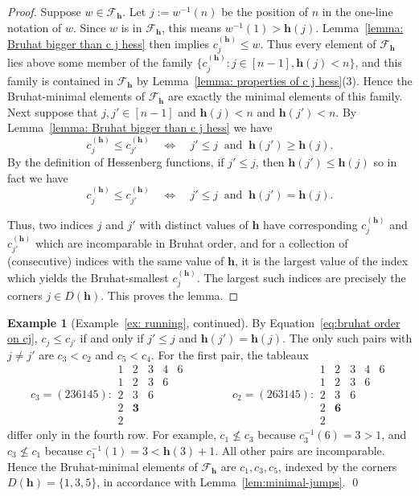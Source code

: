 \documentclass[11pt]{amsart}
\theoremstyle{plain}
\theoremstyle{definition}
\newtheorem{ex}[thm]{Example}
\newcommand{\hess}{{\mathbf h}}
\newcommand{\exampleqed}{%
    {   
    \renewcommand{\qedsymbol}{$\lozenge$}%
    \qed%
    }
}
\numberwithin{equation}{section}
\begin{document}
\begin{proof}
Suppose $w\in\mathcal{F}_\hess$. Let $j:=w^{-1}(n)$ be the position of $n$ in the one-line notation of $w$. Since $w$ is in $\mathcal{F}_\hess$, this means $w^{-1}(1) > \hess(j)$. Lemma~\ref{lemma: Bruhat bigger than c j hess} then implies $c_j^{(\hess)} \leq w$.
Thus every element of $\mathcal{F}_\hess$ lies above some member of the family
$\{c_j^{(\hess)}: j \in [n-1], \hess(j)<n\}$, and this family is contained in $\mathcal{F}_\hess$ by Lemma~\ref{lemma: properties of c j hess}(3). Hence the Bruhat-minimal elements of $\mathcal{F}_\hess$ are exactly the minimal elements of this family.
Next suppose that $j,j' \in [n-1]$ and $\hess(j)<n$ and $\hess(j')<n$. By Lemma~\ref{lemma: Bruhat bigger than c j hess} we have  
\[
c_j^{(\hess)}\le c_{j'}^{(\hess)}
\quad\Longleftrightarrow\quad
j'\le j\ \text{ and }\ \hess(j') \geq \hess(j).
\]
By the definition of Hessenberg functions, if $j'\leq j$, then $\hess(j') \leq \hess(j)$ so in fact we have 
\begin{equation}\label{eq:bruhat order on cj}
  c_j^{(\hess)}\le c_{j'}^{(\hess)}
\quad\Longleftrightarrow\quad
j'\le j\ \text{ and }\ \hess(j') =\hess(j).  
\end{equation}


Thus, two indices $j$ and $j'$ with distinct values of $\hess$ have corresponding $c_j^{(\hess)}$ and $c_{j'}^{(\hess)}$ which are
incomparable in Bruhat order, and for a collection of (consecutive) indices with the same value of $\hess$, it is the largest value of the index which yields the Bruhat-smallest $c_j^{(\hess)}$. 
The largest such indices are precisely the corners $j\in D(\hess)$. This proves the lemma.
\end{proof}

\begin{ex}[Example~\ref{ex: running}, continued] 
By Equation~\ref{eq:bruhat order on cj},  $c_j\leq c_{j'}$ if and only if $j'\leq j$ and $\hess(j')=\hess(j)$.  The only such pairs with $j\neq j'$ are $c_3<c_2$ and $c_5<c_4$. For the first pair, the tableaux
\[
c_3=(236145):
\begin{array}{ccccc}
1&2&3&4&6\\
1&2&3&6\\ 
2&3&6\\ 
2&\mathbf{3}\\ 
2
\end{array}
\qquad\qquad
c_2=(263145):
\begin{array}{ccccc}
1&2&3&4&6\\ 
1&2&3&6\\ 
2&3&6\\ 
2&\mathbf{6}\\
2
\end{array}
\]
differ only in the fourth row. For example, $c_1\not\leq c_3$ because $c_3^{-1}(6)=3>1$, and $c_3\not\leq c_1$ because $c_1^{-1}(1)=3<\hess(3)+1$. All other pairs are incomparable. Hence the Bruhat-minimal elements of $\mathcal F_\hess$ are $c_1,c_3,c_5$, indexed by the corners $D(\hess)=\{1,3,5\}$, in accordance with  Lemma~\ref{lem:minimal-jumps}.
\exampleqed
\end{ex}
\end{document}
